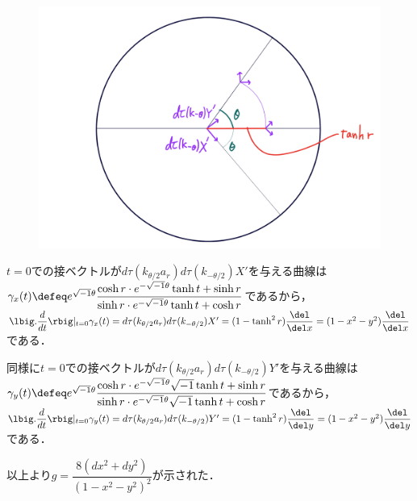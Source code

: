 \begin{pfwn}{}
\begin{figure}[H]
  \centering
  \includegraphics[scale=0.08]{../graph/riem-su11.png}
  \caption{}
  \label{fig:riem-metric-su11}
\end{figure}


$t = 0$での接ベクトルが$d\tau(k_{\theta/2}a_r)d\tau(k_{-\theta/2})X'$を与える曲線は$\gamma_x(t) \defeq  e^{\sqrt{-1} \theta}\dfrac{\cosh r\cdot e^{-\sqrt{-1}\theta} \tanh t + \sinh r }{\sinh r\cdot e^{-\sqrt{-1}\theta} \tanh t + \cosh r} $であるから，$\lbig.\dfrac{d}{dt}\rbig|_{t=0}\gamma_x(t) = d\tau(k_{\theta/2}a_r)d\tau(k_{-\theta/2})X' = (1 - \tanh^2 r)\dfrac{\del}{\del x} = (1-x^2-y^2)\dfrac{\del}{\del x} $である．

同様に$t = 0$での接ベクトルが$d\tau(k_{\theta/2}a_r)d\tau(k_{-\theta/2})Y'$を与える曲線は\\
$\gamma_y(t) \defeq  e^{\sqrt{-1} \theta}\dfrac{\cosh r\cdot e^{-\sqrt{-1}\theta}\sqrt{-1} \tanh t + \sinh r }{\sinh r\cdot e^{-\sqrt{-1}\theta}\sqrt{-1} \tanh t + \cosh r} $であるから，$\lbig.\dfrac{d}{dt}\rbig|_{t=0}\gamma_y(t) = d\tau(k_{\theta/2}a_r)d\tau(k_{-\theta/2})Y' = (1 - \tanh^2 r)\dfrac{\del}{\del y} = (1-x^2-y^2)\dfrac{\del}{\del y} $である．

以上より$g  =  \dfrac{8(dx^2 + dy^2)}{(1 - x^2 - y^2)^2} $が示された．

\end{pfwn}


